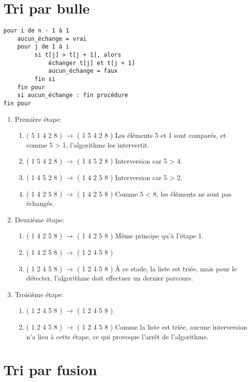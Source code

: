\documentclass[paper=a4, fontsize=9pt]{scrartcl} %
\begin{document}
\begin{multicols}{2}
\section{Tri par bulle}

\begin{verbatim}
pour i de n - 1 à 1
    aucun_échange = vrai
    pour j de 1 à i
         si t[j] > t[j + 1], alors
             échanger t[j] et t[j + 1]
             aucun_échange = faux
         fin si
    fin pour 
    si aucun_échange : fin procédure
fin pour
\end{verbatim}

\begin{enumerate}
\item Première étape:
  \begin{enumerate}
  \item ( 5 1 4 2 8 ) $\to$ ( 1 5 4 2 8 ) Les éléments 5 et 1 sont comparés, et comme 5 > 1, l'algorithme les intervertit.
  \item ( 1 5 4 2 8 ) $\to$ ( 1 4 5 2 8 ) Interversion car 5 > 4.
  \item ( 1 4 5 2 8 ) $\to$ ( 1 4 2 5 8 ) Interversion car 5 > 2.
  \item ( 1 4 2 5 8 ) $\to$ ( 1 4 2 5 8 ) Comme 5 < 8, les éléments ne sont pas échangés.
  \end{enumerate}
\item Deuxième étape:
  \begin{enumerate}
  \item ( 1 4 2 5 8 ) $\to$ ( 1 4 2 5 8 ) Même principe qu'à l'étape 1.
  \item ( 1 4 2 5 8 ) $\to$ ( 1 2 4 5 8 )
  \item ( 1 2 4 5 8 ) $\to$ ( 1 2 4 5 8 )
    À ce stade, la liste est triée, mais pour le détecter, l'algorithme doit effectuer un dernier parcours.
  \end{enumerate}
\item Troisième étape:
  \begin{enumerate}
  \item ( 1 2 4 5 8 ) $\to$ ( 1 2 4 5 8 )
  \item ( 1 2 4 5 8 ) $\to$ ( 1 2 4 5 8 )
    Comme la liste est triée, aucune interversion n'a lieu à cette étape, ce qui provoque l'arrêt de l'algorithme.
  \end{enumerate}
\end{enumerate}
\section{Tri par fusion}


\end{multicols}
\end{document}
